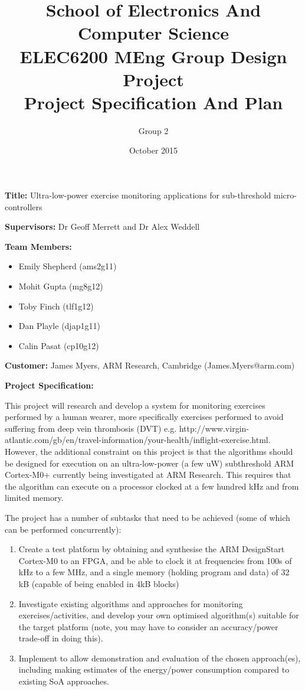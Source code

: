 \documentclass{article}
\title{School of Electronics And Computer Science \\
ELEC6200 MEng Group Design Project \\
Project Specification And Plan}
\author{Group 2}
\date{October 2015}
\begin{document}
\maketitle

\textbf{Title:} Ultra-low-power exercise monitoring applications for sub-threshold micro-controllers

\textbf{Supervisors:} Dr Geoff Merrett and Dr Alex Weddell

\textbf{Team Members:}
\begin{itemize}
    \item Emily Shepherd (ams2g11)
    \item Mohit Gupta (mg8g12)
    \item Toby Finch (tlf1g12)
    \item Dan Playle (djap1g11)
    \item Calin Pasat (cp10g12)
\end{itemize}

\textbf{Customer:} James Myers, ARM Research, Cambridge (James.Myers@arm.com)

\textbf{Project Specification:}

This project will research and develop a system for monitoring exercises performed by a human wearer,
more specifically exercises performed to avoid suffering from deep vein thrombosis (DVT)
e.g. http://www.virgin-atlantic.com/gb/en/travel-information/your-health/inflight-exercise.html.
However, the additional constraint on this project is that the algorithms should be designed for
execution on an ultra-low-power (a few uW) subthreshold ARM Cortex-M0+ currently being investigated
at ARM Research. This requires that the algorithm can execute on a processor clocked at a few hundred
kHz and from limited memory.

The project has a number of subtasks that need to be achieved (some of which can be performed concurrently):
\begin{enumerate}
\item Create a test platform by obtaining and synthesise the ARM DesignStart Cortex-M0 to an FPGA,
and be able to clock it at frequencies from 100s of kHz to a few MHz, and a single memory (holding
program and data) of 32 kB (capable of being enabled in 4kB blocks)
\item Investigate existing algorithms and approaches for monitoring exercises/activities, and develop your own optimised algorithm(s) suitable for the target platform (note, you may have to consider an accuracy/power trade-off in doing this).
\item Implement to allow demonstration and evaluation of the chosen approach(es), including making estimates of the energy/power consumption compared to existing SoA approaches.
\end{enumerate}
\end{document}
